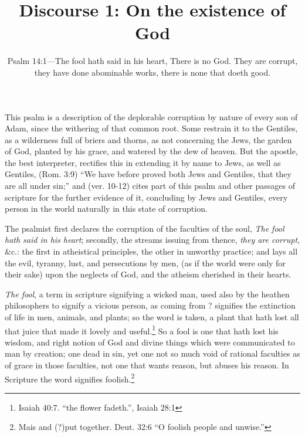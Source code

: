\documentclass{article}
\title{Discourse 1: On the existence of God}
\date{Psalm 14:1---The fool hath said in his heart, There is no God. They are corrupt, they have done abominable works, there is none that doeth good.}
\begin{document}
\maketitle

This psalm is a description 
    of the deplorable corruption by nature of every son of Adam, 
    since the withering of that common root.
Some restrain it to the Gentiles, 
    as a wilderness full of briers and thorns, 
    as not concerning the Jews, the garden of God, 
    planted by his grace, and watered by the dew of heaven. 
But the apostle, the best interpreter, 
    rectifies this in extending it by name to Jews, as well as Gentiles, 
    (Rom. 3:9) ``We have before proved both Jews and Gentiles, 
    that they are all under sin;'' and 
    (ver. 10-12) cites part of this psalm and other passages of scripture 
    for the further evidence of it, 
    concluding by Jews and Gentiles, 
    every person in the world naturally in this state of corruption.

The psalmist first declares the corruption of the faculties of the soul, 
    \emph{The fool hath said in his heart}; 
    secondly, the streams issuing from thence, \emph{they are corrupt}, \&c.: 
    the first in atheistical principles,
    the other in unworthy practice; 
    and lays all the evil, tyranny, lust, and persecutions by men, 
    (as if the world were only for their sake) upon the neglects of God, 
    and the atheism cherished in their hearts.

\emph{The fool}, a term in scripture signifying a wicked man, 
    used also by the heathen philosophers to signify a vicious person, 
     as coming from ? 
    signifies the extinction of life in men, animals, and plants; 
    so the word  is taken, 
    a plant that hath lost all that juice that made it lovely and useful.\footnote{
        Isaiah 40:7.  ``the flower fadeth.'', Isaiah 28:1} 
So a fool is one that hath lost his wisdom, 
    and right notion of God and divine things 
    which were communicated to man by creation; 
    one dead in sin, 
    yet one not so much void of rational faculties 
    as of grace in those faculties, 
    not one that wants reason, but abuses his reason. 
In Scripture the word signifies foolish.\footnote{
        Mais  and (?)put together. 
        Deut. 32:6 ``O foolish people and unwise.''} 
\end{document}
